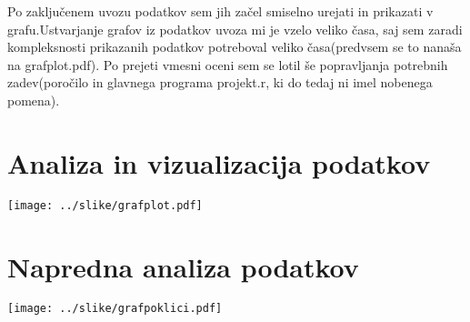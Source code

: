\documentclass[11pt,a4paper]{article}
\begin{document}
Po zaključenem uvozu podatkov sem jih začel smiselno urejati in prikazati v grafu.Ustvarjanje grafov iz podatkov uvoza mi je vzelo veliko časa, saj sem zaradi kompleksnosti prikazanih podatkov potreboval veliko časa(predvsem se to nanaša na grafplot.pdf). Po prejeti vmesni oceni sem se lotil še popravljanja potrebnih zadev(poročilo in glavnega programa projekt.r, ki do tedaj ni imel nobenega pomena).

\section{Analiza in vizualizacija podatkov}

\texttt{[image: ../slike/grafplot.pdf]}

\section{Napredna analiza podatkov}

\texttt{[image: ../slike/grafpoklici.pdf]}
\end{document}
